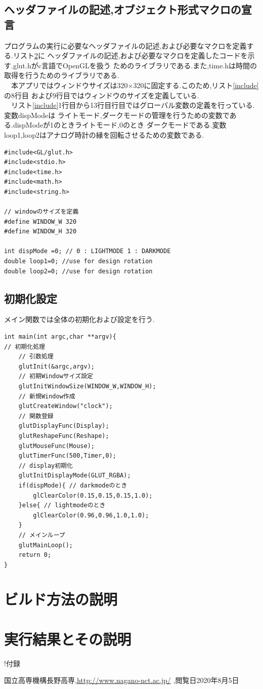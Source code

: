 \documentclass[a4j]{jarticle}
\begin{document}
    \subsection{ヘッダファイルの記述,オブジェクト形式マクロの宣言}
    プログラムの実行に必要なヘッダファイルの記述,および必要なマクロを定義する.リスト\ref{}に
    ヘッダファイルの記述,および必要なマクロを定義したコードを示す.glut.hがc言語でOpenGLを扱う
    ためのライブラリである.また,time.hは時間の取得を行うためのライブラリである.\\
    　本アプリではウィンドウサイズは320$\times$320に固定する.このため,リスト\ref{include}の8行目
    および9行目ではウィンドウのサイズを定義している.\\
    　リスト\ref{include}1行目から13行目行目ではグローバル変数の定義を行っている.変数dispModeは
    ライトモード,ダークモードの管理を行うための変数である.dispModeが1のときライトモード,0のとき
    ダークモードである.変数loop1,loop2はアナログ時計の縁を回転させるための変数である.
    \begin{lstlisting}[basicstyle=\ttfamily\footnotesize, frame=single,label=include,caption=定数,変数の定義]
#include<GL/glut.h>
#include<stdio.h>
#include<time.h>
#include<math.h>
#include<string.h>

// windowのサイズを定義
#define WINDOW_W 320
#define WINDOW_H 320

int dispMode =0; // 0 : LIGHTMODE 1 : DARKMODE
double loop1=0; //use for design rotation
double loop2=0; //use for design rotation
                  \end{lstlisting}

  \subsection{初期化設定}
  メイン関数では全体の初期化および設定を行う.
  \begin{lstlisting}[basicstyle=\ttfamily\footnotesize, frame=single,label=main,caption=main関数]
int main(int argc,char **argv){
// 初期化処理
    // 引数処理
    glutInit(&argc,argv);
    // 初期Windowサイズ設定
    glutInitWindowSize(WINDOW_W,WINDOW_H);
    // 新規Window作成
    glutCreateWindow("clock");
    // 関数登録
    glutDisplayFunc(Display);
    glutReshapeFunc(Reshape);
    glutMouseFunc(Mouse);
    glutTimerFunc(500,Timer,0);
    // display初期化
    glutInitDisplayMode(GLUT_RGBA);
    if(dispMode){ // darkmodeのとき
        glClearColor(0.15,0.15,0.15,1.0);
    }else{ // lightmodeのとき
        glClearColor(0.96,0.96,1.0,1.0);
    }
    // メインループ
    glutMainLoop();
    return 0;
}
  \end{lstlisting}   

    \section{ビルド方法の説明}
    \section{実行結果とその説明}

    !付録
        \begin{thebibliography}{9}
            国立高専機構長野高専,\url{http://www.nagano-nct.ac.jp/} ,閲覧日2020年8月5日
          \end{thebibliography}
\end{document}
